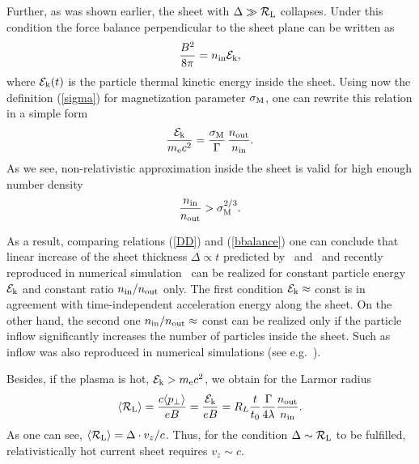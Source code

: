 \documentclass[useAMS,usenatbib]{mn2e}
\begin{document}
 { Further, as was shown earlier, the sheet with $\Delta \gg \mathcal{R}_{\rm L}$ 
 collapses. Under this condition the force balance perpendicular to the sheet plane 
 can be written as
 \begin{equation}
 \frac{B^2}{8\pi} = n_{\rm in} \mathcal{E}_{\rm k},
 \label{balance}
 \end{equation}
 where $\mathcal{E}_{\rm k}(t)$ is the  particle thermal kinetic energy inside the sheet. 
 Using now the definition (\ref{sigma}) for magnetization parameter $\sigma_{\rm M}$, 
 one can rewrite this relation in a simple form
 \begin{equation}
 \frac{\mathcal{E}_{\rm k}}{m_{\rm e} c^2} = 
 \frac{\sigma_{\rm M}}{\Gamma} \, \frac{n_{\rm out}}{n_{\rm in}}.
 \label{bbalance}
 \end{equation}
As we see, non-relativistic approximation inside the sheet is valid for high enough 
number density 
 \begin{equation}
  \frac{n_{\rm in}}{n_{\rm out}} > \sigma_{\rm M}^{2/3}.
 \label{nonrel}
 \end{equation}

As a result, comparing relations (\ref{DD}) and (\ref{bbalance}) one can conclude 
that linear increase of the sheet thickness $\Delta \propto t$ predicted by~\citet{coroniti_striped_wind_1990} and~\citet{michel_pulsar_wind_1994} and 
recently reproduced in numerical simulation~\citep{Q} can be realized for constant
particle energy $\mathcal{E}_{\rm k}$ and constant ratio $n_{\rm in}/n_{\rm out}$
only. The first condition $\mathcal{E}_{\rm k} \approx$ const is in agreement with 
time-independent acceleration energy along the sheet. On the other hand, the second
one $n_{\rm in}/n_{\rm out} \approx$ const can be realized only if the particle
inflow significantly increases the number of particles inside the sheet. Such as
inflow was also reproduced in numerical simulations (see e.g.~\citealt{2015MNRAS.448..606C}).
 
 Besides, if the plasma is hot, $\mathcal{E}_{\rm k} > m_{\rm e} c^2$, we obtain for 
 the Larmor radius
 \begin{equation}
 \langle\mathcal{R}_{\rm L} \rangle = \frac{c\langle p_\perp\rangle }{eB} =
 \frac{\mathcal{E}_{\rm k}}{eB} =
 R_{L}\dfrac{t}{t_0}\dfrac{\Gamma}{4\lambda}\dfrac{n_{\rm out}}{n_{\rm in}}.
 \end{equation}
As one can see, $\langle\mathcal{R}_{\rm L}\rangle = \Delta\cdot v_z/c$. Thus, for 
the condition  $\Delta \sim \mathcal{R}_{\rm L}$ to be fulfilled, relativistically 
hot current sheet requires $v_z \sim c$. 
 }
 
\end{document}
